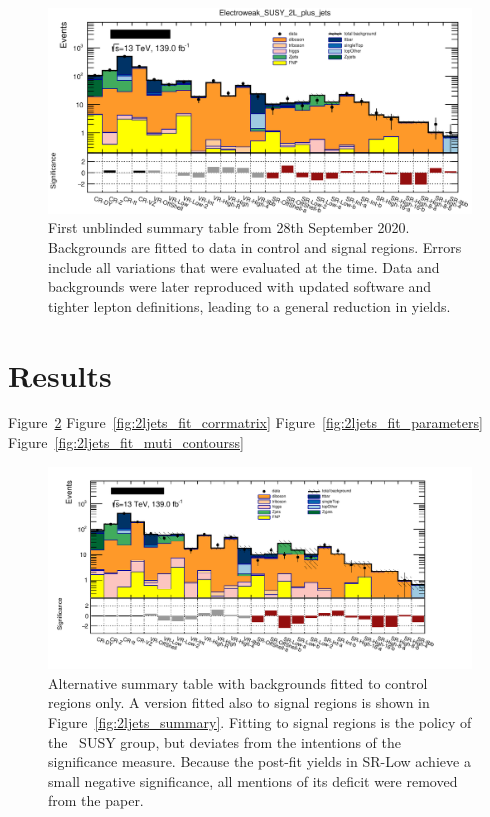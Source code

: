 \begin{figure}[tp]
\centering
\includegraphics[width=\textwidth]{figures/2ljets_summary_unblinding_log.png}
\caption[
First unblinded summary table from 28th September 2020
]{%
First unblinded summary table from 28th September 2020.
Backgrounds are fitted to data in control and signal regions.
Errors include all variations that were evaluated at the time.
Data and backgrounds were later reproduced with updated software and tighter
lepton definitions, leading to a general reduction in yields.
}
\label{fig:2ljets_summary_unblinding}
\end{figure}


\section{Results}
\label{sec:2ljets_results}
Figure~\ref{fig:2ljets_summary_no_sr}
Figure~\ref{fig:2ljets_fit_corrmatrix}
Figure~\ref{fig:2ljets_fit_parameters}
Figure~\ref{fig:2ljets_fit_muti_contourss}

\begin{figure}[tp]
\centering
\includegraphics[width=\textwidth]{figures/2ljets_summary_no_sr_log.png}
\caption[
Alternative summary table with backgrounds fitted to control regions only
]{%
Alternative summary table with backgrounds fitted to control regions only.
A version fitted also to signal regions is shown in
Figure~\ref{fig:2ljets_summary}.
Fitting to signal regions is the policy of the \atlas\ SUSY group, but deviates
from the intentions of the significance measure.
Because the post-fit yields in SR-Low achieve a small negative significance,
all mentions of its deficit were removed from the paper.
}
\label{fig:2ljets_summary_no_sr}
\end{figure}

